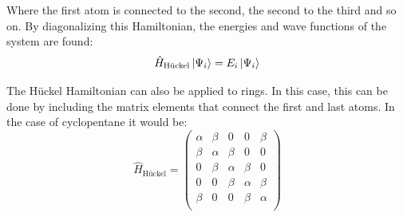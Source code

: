 \documentclass{article}
\begin{document}
Where the first atom is connected to the second, the second to the third and so on. By diagonalizing this Hamiltonian, the energies and wave functions of the system are found:
\begin{equation}
    \hat{H}_{\textrm{Hückel}}\ket{\Psi_i}   =  E_{i}\ket{\Psi_i}
\end{equation}

The Hückel Hamiltonian can also be applied to rings. In this case, this can be done by including the matrix elements that connect the first and last atoms. In the case of cyclopentane it would be: 
\begin{equation}
    \hat{H}_{\textrm{Hückel}}  =
    \begin{pmatrix}
        \alpha & \beta & 0 & 0 & \beta \\
        \beta & \alpha & \beta & 0 & 0 \\
        0 & \beta & \alpha & \beta & 0 \\
        0 & 0 & \beta & \alpha & \beta \\
        \beta & 0 & 0 & \beta & \alpha \\
    \end{pmatrix}
\end{equation}
\end{document}
